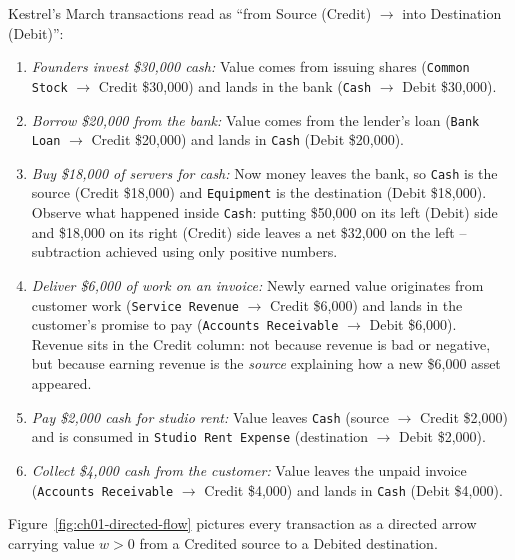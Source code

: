 Kestrel's March transactions read as ``from Source (Credit) $\to$ into Destination (Debit)'':
\begin{enumerate}
  \item \emph{Founders invest \$30,000 cash:} Value comes from issuing shares (\texttt{Common Stock} $\to$ Credit \$30,000) and lands in the bank (\texttt{Cash} $\to$ Debit \$30,000).
  \item \emph{Borrow \$20,000 from the bank:} Value comes from the lender's loan (\texttt{Bank Loan} $\to$ Credit \$20,000) and lands in \texttt{Cash} (Debit \$20,000).
  \item \emph{Buy \$18,000 of servers for cash:} Now money leaves the bank, so \texttt{Cash} is the source (Credit \$18,000) and \texttt{Equipment} is the destination (Debit \$18,000). Observe what happened inside \texttt{Cash}: putting \$50,000 on its left (Debit) side and \$18,000 on its right (Credit) side leaves a net \$32,000 on the left -- subtraction achieved using only positive numbers.
  \item \emph{Deliver \$6,000 of work on an invoice:} Newly earned value originates from customer work (\texttt{Service Revenue} $\to$ Credit \$6,000) and lands in the customer's promise to pay (\texttt{Accounts Receivable} $\to$ Debit \$6,000). Revenue sits in the Credit column: not because revenue is bad or negative, but because earning revenue is the \emph{source} explaining how a new \$6,000 asset appeared.
  \item \emph{Pay \$2,000 cash for studio rent:} Value leaves \texttt{Cash} (source $\to$ Credit \$2,000) and is consumed in \texttt{Studio Rent Expense} (destination $\to$ Debit \$2,000).
  \item \emph{Collect \$4,000 cash from the customer:} Value leaves the unpaid invoice (\texttt{Accounts Receivable} $\to$ Credit \$4,000) and lands in \texttt{Cash} (Debit \$4,000).
\end{enumerate}

Figure~\ref{fig:ch01-directed-flow} pictures every transaction as a directed arrow carrying value $w > 0$ from a Credited source to a Debited destination.

